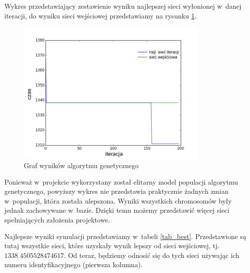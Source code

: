 \documentclass[twoside,12pt]{report}
\begin{document}
Wykres przedstawiający zestawienie wyniku najlepszej sieci wyłonionej w~danej iteracji, do wyniku sieci wejściowej przedstawiamy na rysunku \ref{def_fitness}.

\begin{figure}[ht]
\centering
\includegraphics[width=0.85\textwidth]{img/fitness}
\caption{Graf wyników algorytmu genetycznego}
\label{def_fitness}
\end{figure}

Ponieważ w~projekcie wykorzystany został elitarny model populacji algorytmu genetycznego, powyższy wykres nie przedstawia praktycznie żadnych zmian w~populacji, która została ulepszona. Wyniki wszystkich chromosomów były jednak zachowywane w~bazie. Dzięki temu możemy przedstawić więcej sieci spełniających założenia projektowe.

Najlepsze wyniki symulacji przedstawiamy w~tabeli \ref{tab_best}. Przedstawione są tutaj wszystkie sieci, które uzyskały wynik lepszy od sieci wejściowej, tj. $1338.4505528474617$. Od teraz, będziemy odnosić się do tych sieci używając ich numeru identyfikacyjnego (pierwsza kolumna).
\end{document}
